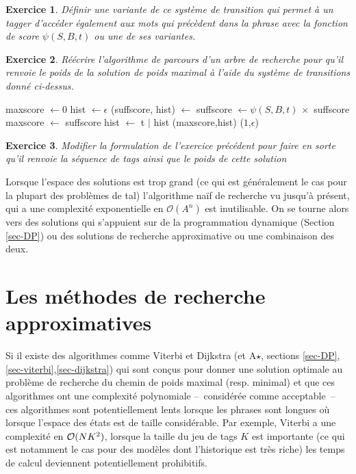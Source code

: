 \documentclass[11pt,openany]{book}
\newtheorem{exo}{Exercice}[chapter]
\newcommand{\ac}[1]{{\sc #1}} %
\begin{document}
\begin{exo}
Définir une variante de ce système de transition qui permet à un tagger d'accéder également aux mots qui précèdent dans la phrase avec la fonction de score $\psi(S,B,t)$ ou une de ses variantes. 
\end{exo}
\begin{exo}
Réécrire l'algorithme de parcours d'un arbre de recherche pour qu'il renvoie le poids de la solution de poids maximal à l'aide du système de transitions donné ci-dessus.
\end{exo}
\begin{solution}
\begin{algorithmic}[1]
\State maxscore $\gets 0$
\State hist $\gets \epsilon$
\State  (suffscore, hist) $\gets$ 
\State suffscore $\gets \psi(S,B,t) \,\times$ suffscore
\State maxscore $\gets$ suffscore
\State hist $\gets$ t $|$ hist 
\EndIf
\EndFor
\State\Return (maxscore,hist)
\Else
  \State\Return ($1$,$\epsilon$)
\EndIf
\EndFunction
\end{algorithmic}
\end{solution}
\begin{exo}
Modifier la formulation de l'exercice précédent pour faire en sorte qu'il renvoie la séquence de tags ainsi que le poids de cette solution
\end{exo}

Lorsque l'espace des solutions est trop grand (ce qui est généralement le cas pour la plupart des problèmes de \ac{tal}) l'algorithme naïf de recherche vu jusqu'à présent, qui a une complexité exponentielle en $\mathcal{O}(A^n)$ est inutilisable. On se tourne alors vers des solutions qui s'appuient sur de la programmation dynamique (Section \ref{sec-DP}) ou des solutions  de recherche approximative ou une combinaison des deux.


\section{Les méthodes de recherche approximatives}

Si il existe des algorithmes comme Viterbi et Dijkstra (et
A$\star$, sections \ref{sec-DP}, \ref{sec-viterbi},\ref{sec-dijkstra}) qui sont conçus pour donner une solution optimale au problème de
recherche du chemin de poids maximal (resp. minimal)
et que ces algorithmes ont une complexité polynomiale --~considérée
comme acceptable~-- ces algorithmes sont potentiellement lents lorsque
les phrases sont longues où lorsque l'espace des états est de taille
considérable. Par exemple, Viterbi a une complexité en ${\cal
  O}(NK^2)$, lorsque la taille du jeu de tags $K$ est importante (ce
qui est notamment le cas pour des modèles dont l'historique est très riche)
les temps de calcul deviennent potentiellement prohibitifs.
\end{document}
